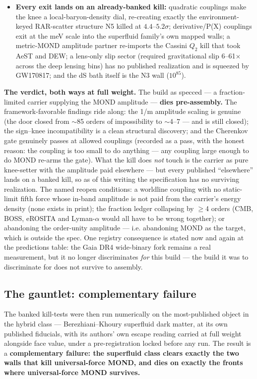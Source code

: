 \documentclass[11pt,a4paper]{article}
\begin{document}
\begin{itemize}
\item \textbf{Every exit lands on an already-banked kill:} quadratic couplings make the knee a local-baryon-density dial, re-creating exactly the environment-keyed RAR-scatter structure N5 killed at $4.4$--$5.2\sigma$; derivative/P(X) couplings exit at the meV scale into the superfluid family's own mapped walls; a metric-MOND amplitude partner re-imports the Cassini $Q_2$ kill that took AeST and DEW; a lens-only slip sector (required gravitational slip 6--61$\times$ across the deep lensing bins) has no published realization and is squeezed by GW170817; and the dS bath itself is the N3 wall ($10^{85}$).

\end{itemize}

\textbf{The verdict, both ways at full weight.} The build as specced --- a fraction-limited carrier supplying the MOND amplitude --- \textbf{dies pre-assembly.} The framework-favorable findings ride along: the 1/m amplitude scaling is genuine (the door closed from $\sim$85 orders of impossibility to $\sim$4--7 --- and is still closed); the sign--knee incompatibility is a clean structural discovery; and the Cherenkov gate genuinely passes at allowed couplings (recorded as a pass, with the honest reason: the coupling is too small to do anything --- any coupling large enough to do MOND re-arms the gate). What the kill does \emph{not} touch is the carrier as pure knee-setter with the amplitude paid elsewhere --- but every published ``elsewhere'' lands on a banked kill, so as of this writing the specification has no surviving realization. The named reopen conditions: a worldline coupling with no static-limit fifth force whose in-band amplitude is not paid from the carrier's energy density (none exists in print); the fraction ledger collapsing by $\ge$4 orders (CMB, BOSS, eROSITA and Lyman-$\alpha$ would all have to be wrong together); or abandoning the order-unity amplitude --- i.e. abandoning MOND as the target, which is outside the spec. One registry consequence is stated now and again at the predictions table: the Gaia DR4 wide-binary fork remains a real measurement, but it no longer discriminates \emph{for} this build --- the build it was to discriminate for does not survive to assembly.

\subsection{The gauntlet: complementary failure}

The banked kill-tests were then run numerically on the most-published object in the hybrid class --- Berezhiani--Khoury superfluid dark matter, at its own published fiducials, with its authors' own escape reading carried at full weight alongside face value, under a pre-registration locked before any run. The result is a \textbf{complementary failure: the superfluid class clears exactly the two walls that kill universal-force MOND, and dies on exactly the fronts where universal-force MOND survives.}
\end{document}
